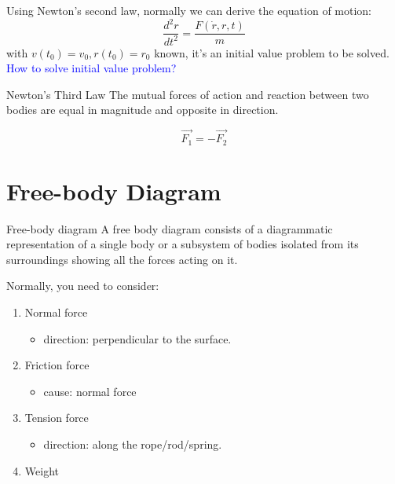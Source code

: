 \documentclass{beamer}
\begin{document}
\begin{frame}
  Using Newton's second law, normally we can derive the equation of motion:
  $$\frac{d^2r}{dt^2}=\frac{F(\dot{r},r,t)}{m}$$ with $v(t_0) = v_0, r(t_0) = r_0$ known, it's an initial value problem to be solved.
  \\\textcolor{blue}{How to solve initial value problem?}
  \begin{block}{Newton's Third Law}
    The mutual forces of action and reaction between two bodies are equal in magnitude and opposite in direction.
  \end{block}
  $$
  \vec{F_1} = -\vec{F_2}
  $$
\end{frame}

\section{Free-body Diagram}
\begin{frame}
  \begin{block}{Free-body diagram}
    A free body diagram consists of a diagrammatic representation of a single body or a subsystem of bodies isolated from its surroundings showing all the forces acting on it.
  \end{block}
  Normally, you need to consider:
  \begin{enumerate}
    \item Normal force
    \begin{itemize}
      \item direction: perpendicular to the surface.
    \end{itemize}
    \item Friction force
    \begin{itemize}
      \item cause: normal force
    \end{itemize}
    \item Tension force
    \begin{itemize}
      \item direction: along the rope/rod/spring.
    \end{itemize}
    \item Weight
  \end{enumerate}
\end{frame}
\end{document}

